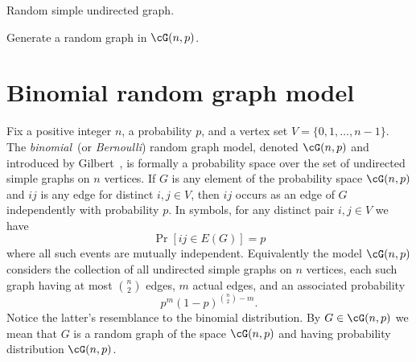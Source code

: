 \begin{algorithm}[!htbp]

\caption{Random simple undirected graph.}
\label{alg:random_graphs:random_simple_graph}
\end{algorithm}

\begin{algorithm}[!htbp]

\caption{Generate a random graph in $\cG(n,p)$.}
\label{alg:random_graphs:generate_random_Gnp}
\end{algorithm}





\section{Binomial random graph model}

Fix a positive integer $n$, a probability $p$, and a vertex set
$V = \{0, 1, \dots, n - 1\}$. The
\emph{binomial}~(or
\emph{Bernoulli}) random graph model,
denoted $\cG(n,p)$ and introduced by Gilbert~\cite{Gilbert1959}, is
formally a probability space over the set of
undirected simple graphs on $n$ vertices. If $G$ is any element of the
probability space $\cG(n,p)$ and $ij$ is any edge for distinct
$i,j \in V$, then $ij$ occurs as an edge of $G$ independently with
probability $p$. In symbols, for any distinct pair $i,j \in V$ we have
\[
\Pr[ij \in E(G)]
=
p
\]
where all such events are mutually independent. Equivalently the model
$\cG(n,p)$ considers the collection of all undirected simple graphs on
$n$ vertices, each such graph having at most $\binom{n}{2}$ edges, $m$
actual edges, and an associated probability
\begin{equation}
\label{eqn:random_graphs:probability_of_chosen_graph_binomial_model}
p^m (1 - p)^{\binom{n}{2} - m}.
\end{equation}
Notice the latter's resemblance to the
binomial distribution. By
$G \in \cG(n,p)$ we mean that $G$ is a random graph of the space
$\cG(n,p)$ and having probability
distribution $\cG(n,p)$.

